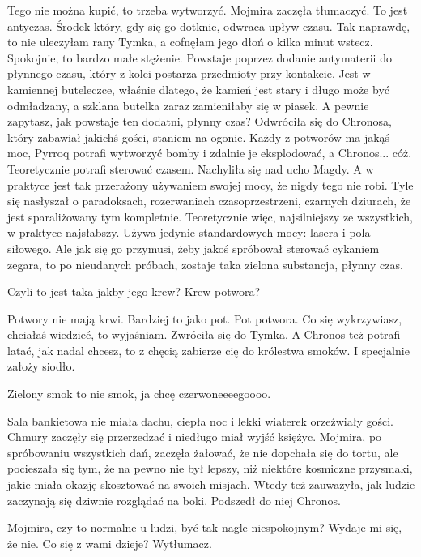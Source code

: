 \ds{} Tego nie można kupić, to trzeba wytworzyć. \dm{} Mojmira zaczęła tłumaczyć. \dm{} To jest antyczas. Środek który, gdy się go dotknie, odwraca upływ czasu. 
Tak naprawdę, to nie uleczyłam rany Tymka, a cofnęłam jego dłoń o kilka minut wstecz. Spokojnie, to bardzo małe stężenie.
Powstaje poprzez dodanie antymaterii do płynnego czasu, który z kolei postarza przedmioty przy kontakcie. 
Jest w kamiennej buteleczce, właśnie dlatego, że kamień jest stary i długo może być odmładzany, a szklana butelka zaraz zamieniłaby się w piasek.
A pewnie zapytasz, jak powstaje ten dodatni, płynny czas? 
\dm{} Odwróciła się do Chronosa, który zabawiał jakichś gości, staniem na ogonie. \dm{} 
Każdy z potworów ma jakąś moc, Pyrroq potrafi wytworzyć bomby i zdalnie je eksplodować, a Chronos... cóż. Teoretycznie potrafi sterować czasem.
\dm{} Nachyliła się nad ucho Magdy. \dm{} A w praktyce jest tak przerażony używaniem swojej mocy, że nigdy tego nie robi.
Tyle się nasłyszał o paradoksach, rozerwaniach czasoprzestrzeni, czarnych dziurach, że jest sparaliżowany tym kompletnie.
Teoretycznie więc, najsilniejszy ze wszystkich, w praktyce najsłabszy.
Używa jedynie standardowych mocy: lasera i pola siłowego.
Ale jak się go przymusi, żeby jakoś spróbował sterować cykaniem zegara, to po nieudanych próbach, zostaje taka zielona substancja, płynny czas. \de{}

\ds{} Czyli to jest taka jakby jego krew? Krew potwora? \de{}

\ds{} Potwory nie mają krwi. Bardziej to jako pot. Pot potwora. Co się wykrzywiasz, chciałaś wiedzieć, to wyjaśniam. \dm{} Zwróciła się do Tymka. \dm{}
A Chronos też potrafi latać, jak nadal chcesz, to z chęcią zabierze cię do królestwa smoków. I specjalnie założy siodło. \de{}

\ds{} Zielony smok to nie smok, ja chcę czerwoneeeegoooo. \de{}

\divider{}

Sala bankietowa nie miała dachu, ciepła noc i lekki wiaterek orzeźwiały gości.
Chmury zaczęły się przerzedzać i niedługo miał wyjść księżyc.
Mojmira, po spróbowaniu wszystkich dań, zaczęła żałować, że nie dopchała się do tortu, ale pocieszała się tym, 
że na pewno nie był lepszy, niż niektóre kosmiczne przysmaki, jakie miała okazję skosztować na swoich misjach.
Wtedy też zauważyła, jak ludzie zaczynają się dziwnie rozglądać na boki. 
Podszedł do niej Chronos.

\ds{} Mojmira, czy to normalne u ludzi, być tak nagle niespokojnym? Wydaje mi się, że nie. Co się z wami dzieje? Wytłumacz. \de{}

